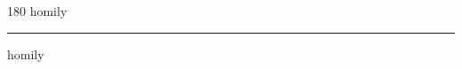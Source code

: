 
\begin{frame}
\begin{center}
\begin{turn}{180}
{\fontsize{2.5cm}{1em}\selectfont homily}
\end{turn}
\vspace{1em}\par  
\hrule
\vspace{1em}\par  
{\fontsize{2.5cm}{1em}\selectfont homily}
\end{center}
\end{frame}
